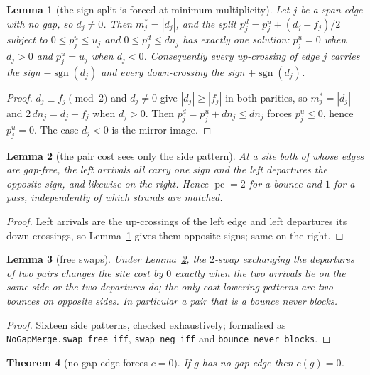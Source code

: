 \documentclass[11pt]{article}
\theoremstyle{plain}
\newtheorem{theorem}{Theorem}
\newtheorem{lemma}[theorem]{Lemma}
\theoremstyle{definition}
\theoremstyle{remark}
\begin{document}
\begin{lemma}[the sign split is forced at minimum multiplicity]\label{lem:splitforced}
Let $j$ be a span edge with no gap, so $d_j\ne0$. Then $m_j^\ast=|d_j|$, and the split
$p^d_j=p^u_j+(d_j-f_j)/2$ subject to $0\le p^u_j\le u_j$ and $0\le p^d_j\le dn_j$ has exactly one
solution: $p^u_j=0$ when $d_j>0$ and $p^u_j=u_j$ when $d_j<0$. Consequently every up-crossing of
edge $j$ carries the sign $-\operatorname{sgn}(d_j)$ and every down-crossing the sign
$+\operatorname{sgn}(d_j)$.
\end{lemma}

\begin{proof}
$d_j\equiv f_j\pmod 2$ and $d_j\ne0$ give $|d_j|\ge|f_j|$ in both parities, so $m_j^\ast=|d_j|$ and
$2\,dn_j=d_j-f_j$ when $d_j>0$. Then $p^d_j=p^u_j+dn_j\le dn_j$ forces $p^u_j\le0$, hence
$p^u_j=0$. The case $d_j<0$ is the mirror image.
\end{proof}

\begin{lemma}[the pair cost sees only the side pattern]\label{lem:sidesonly}
At a site both of whose edges are gap-free, the left arrivals all carry one sign and the left
departures the opposite sign, and likewise on the right. Hence
$\operatorname{pc}=2$ for a bounce and $1$ for a pass, independently of which strands are matched.
\end{lemma}

\begin{proof}
Left arrivals are the up-crossings of the left edge and left departures its down-crossings, so
Lemma~\ref{lem:splitforced} gives them opposite signs; same on the right.
\end{proof}

\begin{lemma}[free swaps]\label{lem:freeswap}
Under Lemma~\ref{lem:sidesonly}, the $2$-swap exchanging the departures of two pairs changes the
site cost by $0$ exactly when the two arrivals lie on the same side or the two departures do; the
only cost-lowering patterns are two bounces on opposite sides. In particular a pair that is a bounce
never blocks.
\end{lemma}

\begin{proof}
Sixteen side patterns, checked exhaustively; formalised as
\texttt{NoGapMerge.swap\_free\_iff}, \texttt{swap\_neg\_iff} and \texttt{bounce\_never\_blocks}.
\end{proof}

\begin{theorem}[no gap edge forces $c=0$]\label{thm:nogap}
If $g$ has no gap edge then $c(g)=0$.
\end{theorem}
\end{document}
